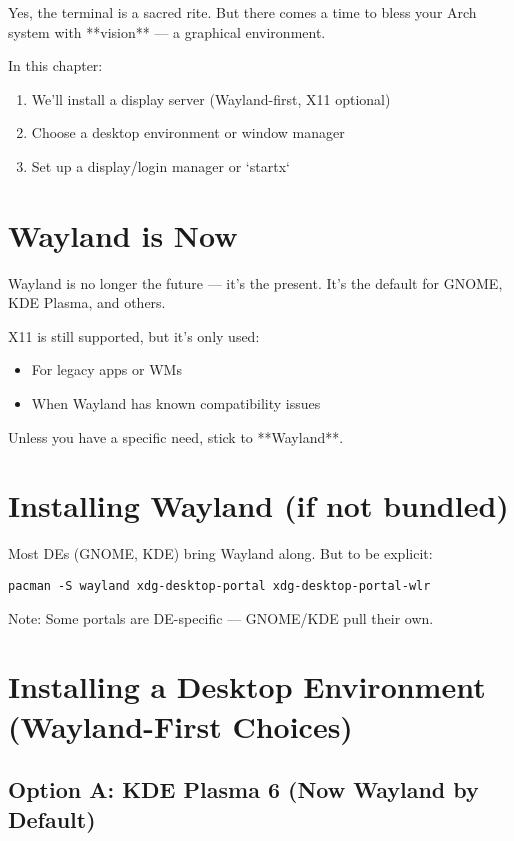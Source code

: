 \documentclass[12pt,openany]{book}
\begin{document}
Yes, the terminal is a sacred rite. But there comes a time to bless your Arch system with **vision** — a graphical environment.

In this chapter:

\begin{enumerate}
  \item We’ll install a display server (Wayland-first, X11 optional)
  \item Choose a desktop environment or window manager
  \item Set up a display/login manager or `startx`
\end{enumerate}

\section{Wayland is Now}

Wayland is no longer the future — it’s the present. It’s the default for GNOME, KDE Plasma, and others.

X11 is still supported, but it's only used:
\begin{itemize}
  \item For legacy apps or WMs
  \item When Wayland has known compatibility issues
\end{itemize}

Unless you have a specific need, stick to **Wayland**.

\section{Installing Wayland (if not bundled)}

Most DEs (GNOME, KDE) bring Wayland along. But to be explicit:

\begin{lstlisting}
pacman -S wayland xdg-desktop-portal xdg-desktop-portal-wlr
\end{lstlisting}

Note: Some portals are DE-specific — GNOME/KDE pull their own.

\section{Installing a Desktop Environment (Wayland-First Choices)}

\subsection*{Option A: KDE Plasma 6 (Now Wayland by Default)}
\end{document}
